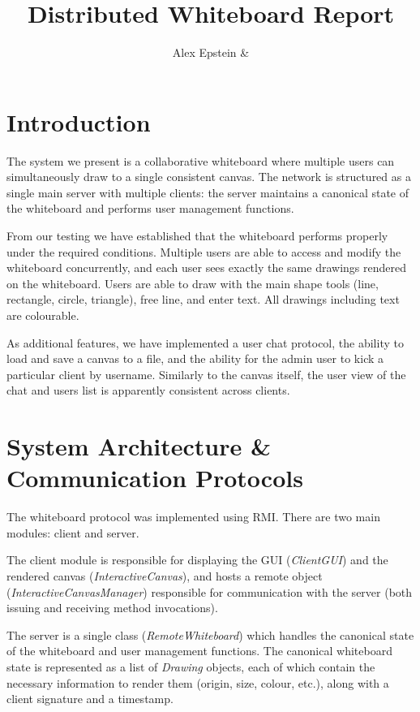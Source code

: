 \documentclass[12pt,a4paper]{report}
\title{Distributed Whiteboard Report}
\author{Alex Epstein \& }
\begin{document}
\maketitle


\section{Introduction}

The system we present is a collaborative whiteboard where multiple users can simultaneously draw to a single consistent canvas. The network is structured as a single main server with multiple clients: the server maintains a canonical state of the whiteboard and performs user management functions. 

From our testing we have established that the whiteboard performs properly under the required conditions. Multiple users are able to access and modify the whiteboard concurrently, and each user sees exactly the same drawings rendered on the whiteboard. Users are able to draw with the main shape tools (line, rectangle, circle, triangle), free line, and enter text. All drawings including text are colourable. 

As additional features, we have implemented a user chat protocol, the ability to load and save a canvas to a file, and the ability for the admin user to kick a particular client by username. Similarly to the canvas itself, the user view of the chat and users list is apparently consistent across clients. 

\section{System Architecture \& Communication Protocols}

The whiteboard protocol was implemented using RMI. There are two main modules: client and server. 

The client module is responsible for displaying the GUI (\textit{ClientGUI}) and the rendered canvas (\textit{InteractiveCanvas}), and hosts a remote object (\textit{InteractiveCanvasManager}) responsible for communication with the server (both issuing and receiving method invocations). 

The server is a single class (\textit{RemoteWhiteboard}) which handles the canonical state of the whiteboard and user management functions. The canonical whiteboard state is represented as a list of \textit{Drawing} objects, each of which contain the necessary information to render them (origin, size, colour, etc.), along with a client signature and a timestamp. 
\end{document}

